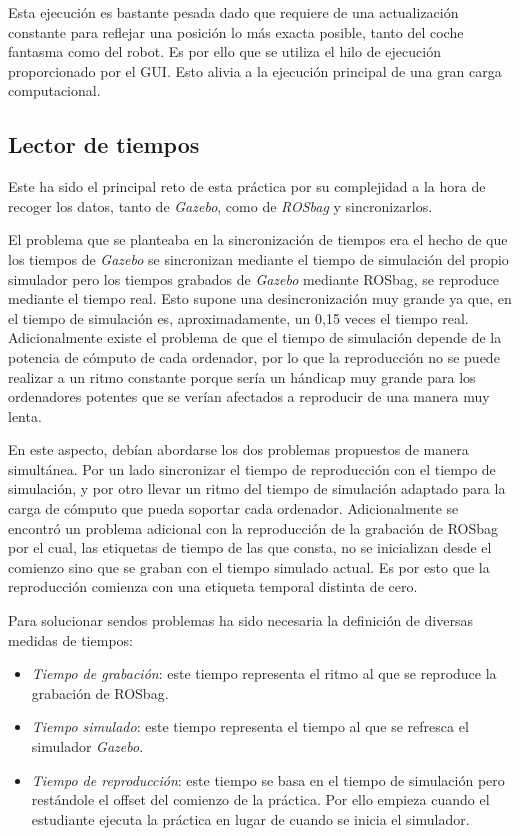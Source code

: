 Esta ejecución es bastante pesada dado que requiere de una actualización constante para reflejar una posición lo más exacta posible, tanto del coche fantasma como del robot. Es por ello que se utiliza el hilo de ejecución proporcionado por el GUI. Esto alivia a la ejecución principal de una gran carga computacional.

\subsection{Lector de tiempos}
Este ha sido el principal reto de esta práctica por su complejidad a la hora de recoger los datos, tanto de \textit{Gazebo}, como de \textit{ROSbag} y sincronizarlos.

El problema que se planteaba en la sincronización de tiempos era el hecho de que los tiempos de \textit{Gazebo} se sincronizan mediante el tiempo de simulación del propio simulador pero los tiempos grabados de \textit{Gazebo} mediante ROSbag, se reproduce mediante el tiempo real. Esto supone una desincronización muy grande ya que, en el tiempo de simulación es, aproximadamente, un 0,15 veces el tiempo real. Adicionalmente existe el problema de que el tiempo de simulación depende de la potencia de cómputo de cada ordenador, por lo que la reproducción no se puede realizar a  un ritmo constante porque sería un hándicap muy grande para los ordenadores potentes que se verían afectados a reproducir de una manera muy lenta.

En este aspecto, debían abordarse los dos problemas propuestos de manera simultánea. Por un lado sincronizar el tiempo de reproducción con el tiempo de simulación, y por otro llevar un ritmo del tiempo de simulación adaptado para la carga de cómputo que pueda soportar cada ordenador. Adicionalmente se encontró un problema adicional con la reproducción de la grabación de ROSbag por el cual, las etiquetas de tiempo de las que consta, no se inicializan desde el comienzo sino que se graban con el tiempo simulado actual. Es por esto que la reproducción comienza con una etiqueta temporal distinta de cero.

Para solucionar sendos problemas ha sido necesaria la definición de diversas medidas de tiempos:

\begin{itemize}
	\item \textit{Tiempo de grabación}: este tiempo representa el ritmo al que se reproduce la grabación de ROSbag.
	\item \textit{Tiempo simulado}: este tiempo representa el tiempo al que se refresca el simulador \textit{Gazebo}.
	\item \textit{Tiempo de reproducción}: este tiempo se basa en el tiempo de simulación pero restándole el offset del comienzo de la práctica. Por ello empieza cuando el estudiante ejecuta la práctica en lugar de cuando se inicia el simulador.
\end{itemize}

